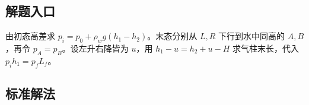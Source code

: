 \documentclass[UTF8,fontset=fandol,a4paper,11pt]{ctexart}
\begin{document}


\subsection*{解题入口}

由初态高差求 $p_i=p_0+\rho_wg(h_1-h_2)$。末态分别从 $L,R$ 下行到水中同高的 $A,B$，再令 $p_A=p_B$。设左升右降皆为 $u$，用 $h_1-u=h_2+u-H$ 求气柱末长，代入 $p_ih_1=p_fL_f$。



\subsection*{标准解法}
\end{document}
